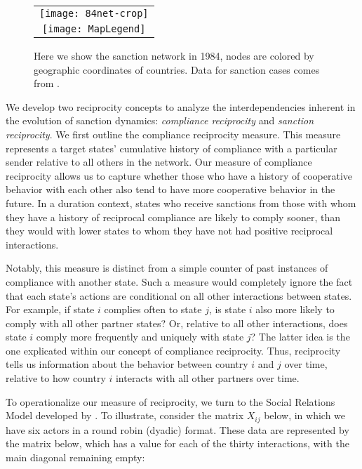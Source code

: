 \begin{figure}[ht]
  \centering
  \begin{tabular}{c}
	  \texttt{[image: 84net-crop]} \\
	  \texttt{[image: MapLegend]}
  \end{tabular}
  \caption{Here we show the sanction network in 1984, nodes are colored by geographic coordinates of countries. Data for sanction cases comes from \citet{morgan2009threat}.}
  \label{fig:spaghetti}
\end{figure}
\FloatBarrier

We develop two reciprocity concepts to analyze the interdependencies inherent in the evolution of sanction dynamics: \textit{compliance reciprocity} and \textit{sanction reciprocity}. We first outline the compliance reciprocity measure. This measure represents a target states' cumulative history of compliance with a particular sender relative to all others in the network. Our measure of compliance reciprocity allows us to capture whether those who have a history of cooperative behavior with each other also tend to have more cooperative behavior in the future. In a duration context, states who receive sanctions from those with whom they have a history of reciprocal compliance are likely to comply sooner, than they would with lower states to whom they have not had positive reciprocal interactions. 

Notably, this measure is distinct from a simple counter of past instances of compliance with another state. Such a measure would completely ignore the fact that each state's actions are conditional on all other interactions between states. For example, if state $i$ complies often to state $j$, is state $i$ also more likely to comply with all other partner states? Or, relative to all other interactions, does state $i$ comply more frequently and uniquely with state $j$? The latter idea is the one explicated within our  concept of compliance reciprocity. Thus, reciprocity tells us information about the behavior between country $i$ and $j$ over time, relative to how country $i$ interacts with all other partners over time. 


To operationalize our measure of reciprocity, we turn to the Social Relations Model developed by \citet{kenny1994interpersonal}. To illustrate, consider the matrix $X_{ij}$ below, in which we have six actors in a round robin (dyadic) format. These data are represented by the matrix below, which has a value for each of the thirty interactions, with the main diagonal remaining empty:

